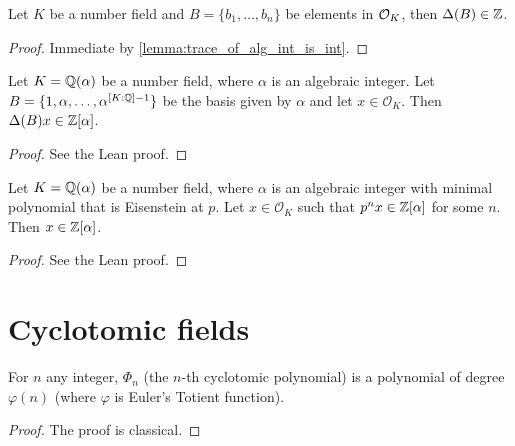 \begin{lemma}\label{lemma:int_basis_int_disc}
    \leanok
	Let $K$ be a number field and $B=\{b_1,\dots,b_n\}$ be elements in $\mathcal{O}_K$, then $\Delta(B) \in \mathbb{Z}$.
\end{lemma}
\begin{proof}
    \leanok
    Immediate by \ref{lemma:trace_of_alg_int_is_int}.
\end{proof}


\begin{lemma}\label{lemma:disc_int_basis}
	\leanok
	Let $K = \mathbb{Q}(\alpha)$ be a number field, where $\alpha$ is an algebraic integer. Let $B = \{1, \alpha, \ldots, \alpha^{[K : \mathbb{Q}] - 1} \}$ be the basis given by $\alpha$ and let $x \in \mathcal{O}_K$. Then $\Delta(B)x \in \mathbb{Z}[\alpha]$.
\end{lemma}

\begin{proof}
    \leanok
    See the Lean proof.
\end{proof}

\begin{lemma}\label{lemma:eis_crit_and_alg_ints}
	\leanok
	Let $K = \mathbb{Q}(\alpha)$ be a number field, where $\alpha$ is an algebraic integer with minimal polynomial that is Eisenstein at $p$. Let $x \in \mathcal{O}_K$ such that $p^n x \in \mathbb{Z}[\alpha]$ for some $n$. Then $x \in \mathbb{Z}[\alpha]$.
\end{lemma}
\begin{proof}
    \leanok
    See the Lean proof.
\end{proof}

\section{Cyclotomic fields}

\begin{lemma}\label{lemma:cyclo_poly_deg}
    \leanok
	For $n$ any integer, $\Phi_n$ (the $n$-th cyclotomic polynomial) is a polynomial of degree $\varphi(n)$ (where $\varphi$ is Euler's Totient function).
\end{lemma}
\begin{proof}
    \leanok
The proof is classical.
\end{proof}


